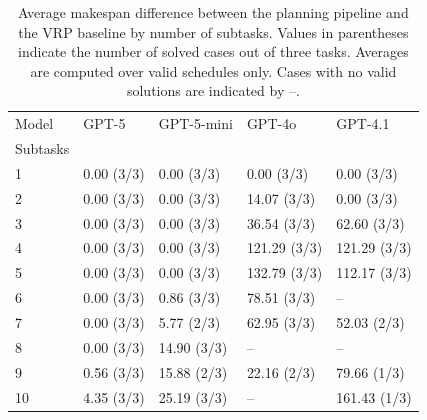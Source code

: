 \begin{table}[htbp]
\centering
\caption[Average makespan difference between the planning pipeline and the VRP baseline by number of subtasks.]
{Average makespan difference between the planning pipeline and the VRP baseline by number of subtasks. 
Values in parentheses indicate the number of solved cases out of three tasks.
Averages are computed over valid schedules only. Cases with no valid solutions are indicated by --.}
\label{tab:avg_vrp_gap_by_subtasks}
\centering
\begin{tabular}{lllll}
\toprule
Model & GPT-5 & GPT-5-mini & GPT-4o & GPT-4.1 \\
Subtasks &  &  &  &  \\
\midrule
1 & 0.00 (3/3) & 0.00 (3/3) & 0.00 (3/3) & 0.00 (3/3) \\
2 & 0.00 (3/3) & 0.00 (3/3) & 14.07 (3/3) & 0.00 (3/3) \\
3 & 0.00 (3/3) & 0.00 (3/3) & 36.54 (3/3) & 62.60 (3/3) \\
4 & 0.00 (3/3) & 0.00 (3/3) & 121.29 (3/3) & 121.29 (3/3) \\
5 & 0.00 (3/3) & 0.00 (3/3) & 132.79 (3/3) & 112.17 (3/3) \\
6 & 0.00 (3/3) & 0.86 (3/3) & 78.51 (3/3) & --  \\
7 & 0.00 (3/3) & 5.77 (2/3) & 62.95 (3/3) & 52.03 (2/3) \\
8 & 0.00 (3/3) & 14.90 (3/3) & --  & --  \\
9 & 0.56 (3/3) & 15.88 (2/3) & 22.16 (2/3) & 79.66 (1/3) \\
10 & 4.35 (3/3) & 25.19 (3/3) & --  & 161.43 (1/3) \\
\bottomrule
\end{tabular}

\end{table}
